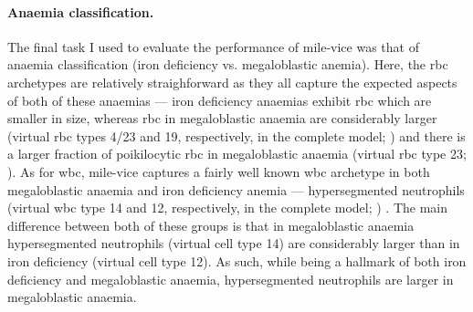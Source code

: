 \begin{figure}[!ht]
    \label{fig:mile-vice-vcq-so-mds-classification}
\end{figure}

\begin{figure}[!ht]
    \label{fig:rbc-mds-classification-examples}
\end{figure}

\begin{figure}[!ht]
    \label{fig:wbc-mds-classification-examples}
\end{figure}

\paragraph{Anaemia classification.} The final task I used to evaluate the performance of \ac{mile-vice} was that of anaemia classification (iron deficiency vs. megaloblastic anemia). Here, the \ac{rbc} archetypes are relatively straighforward as they all capture the expected aspects of both of these anaemias --- iron deficiency anaemias exhibit \ac{rbc} which are smaller in size, whereas \ac{rbc} in megaloblastic anaemia are considerably larger (virtual \ac{rbc} types 4/23 and 19, respectively, in the complete model; ) and there is a larger fraction of poikilocytic \ac{rbc} in megaloblastic anaemia (virtual \ac{rbc} type 23; ). As for \ac{wbc}, \ac{mile-vice} captures a fairly well known \ac{wbc} archetype in both megaloblastic anaemia and iron deficiency anemia --- hypersegmented neutrophils (virtual \ac{wbc} type 14 and 12, respectively, in the complete model; ) \cite{Lindenbaum1980 -ux,Westerman1999-gs}. The main difference between both of these groups is that in megaloblastic anaemia hypersegmented neutrophils (virtual cell type 14) are considerably larger than in iron deficiency (virtual cell type 12). As such, while being a hallmark of both iron deficiency and megaloblastic anaemia, hypersegmented neutrophils are larger in megaloblastic anaemia.

